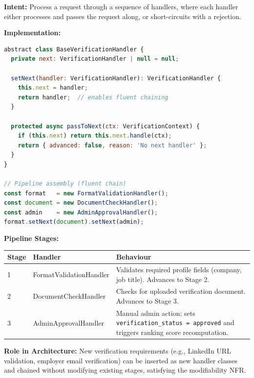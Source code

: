 \documentclass[12pt,a4paper]{article}
\begin{document}
\textbf{Intent:} Process a request through a sequence of handlers, where each handler either processes and passes the request along, or short-circuits with a rejection.

\textbf{Implementation:}

\begin{lstlisting}[language=JavaScript, caption={Chain of Responsibility assembly in VerificationPipeline.ts}]
abstract class BaseVerificationHandler {
  private next: VerificationHandler | null = null;

  setNext(handler: VerificationHandler): VerificationHandler {
    this.next = handler;
    return handler;  // enables fluent chaining
  }

  protected async passToNext(ctx: VerificationContext) {
    if (this.next) return this.next.handle(ctx);
    return { advanced: false, reason: 'No next handler' };
  }
}

// Pipeline assembly (fluent chain)
const format   = new FormatValidationHandler();
const document = new DocumentCheckHandler();
const admin    = new AdminApprovalHandler();
format.setNext(document).setNext(admin);
\end{lstlisting}

\textbf{Pipeline Stages:}

\begin{center}
\begin{tabular}{@{}p{1.5cm} p{3.5cm} p{7.6cm}@{}}
\toprule
\textbf{Stage} & \textbf{Handler} & \textbf{Behaviour} \\
\midrule
1 & FormatValidationHandler & Validates required profile fields (company, job title). Advances to Stage 2. \\
2 & DocumentCheckHandler & Checks for uploaded verification document. Advances to Stage 3. \\
3 & AdminApprovalHandler & Manual admin action; sets \texttt{verification\_status = approved} and triggers ranking score recomputation. \\
\bottomrule
\end{tabular}
\end{center}

\textbf{Role in Architecture:} New verification requirements (e.g., LinkedIn URL validation, employer email verification) can be inserted as new handler classes and chained without modifying existing stages, satisfying the modifiability NFR.

\newpage

\end{document}
